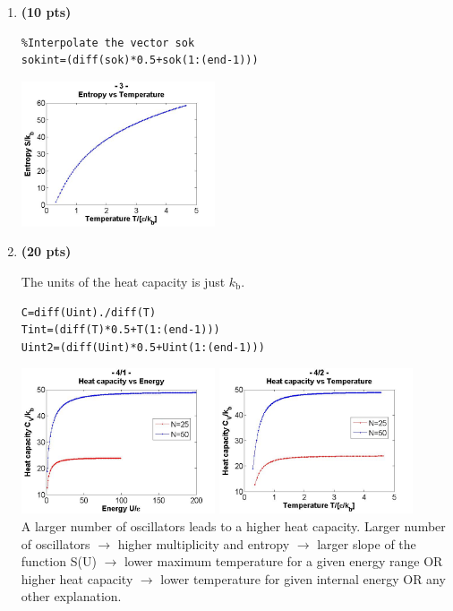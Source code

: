 \documentclass[11pt]{article}
\begin{document}
\begin{enumerate}[resume]
\item \textbf{(10 pts)} 

\begin{verbatim}
%Interpolate the vector sok
sokint=(diff(sok)*0.5+sok(1:(end-1)))
\end{verbatim}

\includegraphics[width=0.45\textwidth]{P3.jpg}

\item \textbf{(20 pts)} 

The units of the heat capacity is just $k_\mathrm{b}$.

\begin{verbatim}
C=diff(Uint)./diff(T)
Tint=(diff(T)*0.5+T(1:(end-1)))
Uint2=(diff(Uint)*0.5+Uint(1:(end-1)))
\end{verbatim}

\includegraphics[width=0.45\textwidth]{P4_1.jpg}
\includegraphics[width=0.45\textwidth]{P4_2.jpg}\\

A larger number of oscillators leads to a higher heat capacity. Larger number of oscillators $\rightarrow$ higher multiplicity and entropy $\rightarrow$ larger slope of the function S(U) $\rightarrow$ lower maximum temperature for a given energy range OR higher heat capacity $\rightarrow$ lower temperature for given internal energy OR any other explanation.

\end{enumerate}
\end{document}
